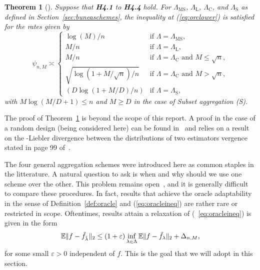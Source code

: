 \documentclass[11pt, letter paper]{article}
\newcommand{\1}{\mathmybb{1}}
\newtheorem{theorem}[proposition]{Theorem}
\newcommand{\0}{\emptyset}
\newcommand{\E}{\mathbb{E}}
\newcommand{\paren}[1]{\left(#1 \right)}
\newcommand{\norm}[1]{|\hspace{-1pt}|#1 |\hspace{-1pt}|}
\newcommand{\ftilde}[1]{\tilde{f}_{#1}}
\newcommand{\lambdahat}[1]{\hat{\lambda}_{#1}}
\begin{document}
\begin{theorem}[\cite{bunea_2007}]\label{prop:buneath5.1}
    Suppose that \textbf{H4.1} to \textbf{H4.4} hold. For \(\Lambda_{\mathrm{MS}}\), \(\Lambda_{\mathrm{L}}\), \(\Lambda_{\mathrm{C}}\), and \(\Lambda_{\mathrm{S}}\) as defined in Section~\ref{sec:buneaschemes}, the inequality at (\ref{eq:orclower}) is satisfied for the rates given by
    \begin{equation}\label{eq:rates}
        \psi_{n,M}\asymp\begin{cases}
            \log(M)/n &\text{if }\Lambda = \Lambda_{\mathrm{MS}},\\[1mm]
            M/n &\text{if }\Lambda = \Lambda_{\mathrm{L}},\\[1mm]
            M/n &\text{if }\Lambda = \Lambda_{\mathrm{C}}\text{ and }M\leq\sqrt{n},\\[1mm]
            \sqrt{\log\paren{1+M/\sqrt{n}}/n}&\text{if }\Lambda = \Lambda_{\mathrm{C}}\text{ and }M>\sqrt{n},\\[1mm]
            (D\log(1+M/D)/n) &\text{if }\Lambda = \Lambda_{\mathrm{S}},
        \end{cases}
    \end{equation}
    with \(M \log(M/D+1) \leq n \) and \(M \geq D\) in the case of Subset aggregation (S).
\end{theorem}

The proof of Theorem~\ref{prop:buneath5.1} is beyond the scope of this report. A proof in the case of a random design (being considered here) can be found in~\textcite{tsybakov_ora} and relies on a result on the -Liebler divergence between the distributions of two estimators vergence stated in page 99 of~\textcite{tsybakov_introduction_2009}.

The four general aggregation schemes were introduced here as common staples in the litterature. A natural question to ask is when and why should we use one scheme over the other. This problem remains open~\cite{bunea_2007}, and it is generally difficult to compare these procedures. In fact, results that achieve the oracle adaptability in the sense of Definition~\ref{def:oracle} and (\ref{eq:oracleineq}) are rather rare or restricted in scope. Oftentimes, results attain a relaxation of (~\ref{eq:oracleineq}) is given in the form
\begin{equation}\label{eq:oraclerelax}
    \E\norm{f - \ftilde{\lambdahat{}}}_{2} \leq (1+\varepsilon)\inf_{\lambda\in\Lambda}\E\norm{f - \ftilde{\lambda}}_{2} + \Delta_{n,M},
\end{equation}
for some small \(\varepsilon>0\) independent of \(f\). This is the goal that we will adopt in this section.
\end{document}
